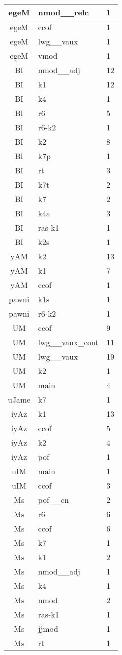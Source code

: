\documentclass[a4 paper]{article}
\begin{document}
\begin{longtable}{cp{}p{}}
egeM & nmod\_\_relc & 1\\ \midrule egeM & ccof & 1\\ \midrule egeM & lwg\_\_vaux & 1\\ \midrule egeM & vmod & 1\\ \midrule 
BI & nmod\_\_adj & 12\\ \midrule BI & k1 & 12\\ \midrule BI & k4 & 1\\ \midrule BI & r6 & 5\\ \midrule BI & r6-k2 & 1\\ \midrule BI & k2 & 8\\ \midrule BI & k7p & 1\\ \midrule BI & rt & 3\\ \midrule BI & k7t & 2\\ \midrule BI & k7 & 2\\ \midrule BI & k4a & 3\\ \midrule BI & ras-k1 & 1\\ \midrule BI & k2s & 1\\ \midrule 
yAM & k2 & 13\\ \midrule yAM & k1 & 7\\ \midrule yAM & ccof & 1\\ \midrule 
pawni & k1s & 1\\ \midrule pawni & r6-k2 & 1\\ \midrule 
UM & ccof & 9\\ \midrule UM & lwg\_\_vaux\_cont & 11\\ \midrule UM & lwg\_\_vaux & 19\\ \midrule UM & k2 & 1\\ \midrule UM & main & 4\\ \midrule 
uJame & k7 & 1\\ \midrule 
iyAz & k1 & 13\\ \midrule iyAz & ccof & 5\\ \midrule iyAz & k2 & 4\\ \midrule iyAz & pof & 1\\ \midrule 
uIM & main & 1\\ \midrule uIM & ccof & 3\\ \midrule 
Ms & pof\_\_cn & 2\\ \midrule Ms & r6 & 6\\ \midrule Ms & ccof & 6\\ \midrule Ms & k7 & 1\\ \midrule Ms & k1 & 2\\ \midrule Ms & nmod\_\_adj & 1\\ \midrule Ms & k4 & 1\\ \midrule Ms & nmod & 2\\ \midrule Ms & ras-k1 & 1\\ \midrule Ms & jjmod & 1\\ \midrule Ms & rt & 1\\ \midrule 

\end{longtable}
\end{document}
